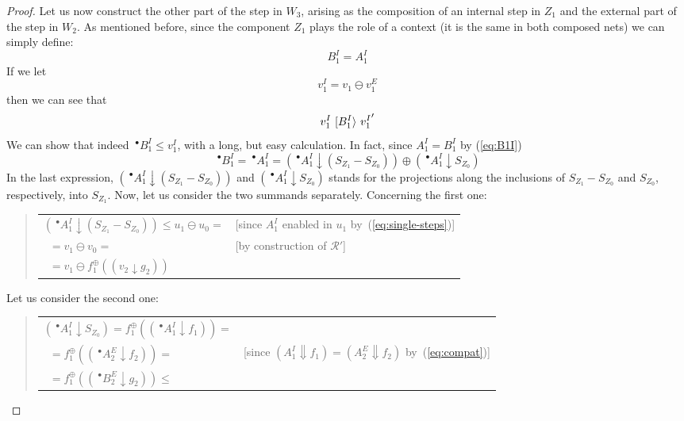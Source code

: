 \documentclass{LMCS}
\newcommand{\monSub}[2]{\ensuremath{{#1}_{#2}^\oplus}}
\newcommand{\res}[2]{\ensuremath{({#1}\!\downarrow\!{#2})}}
\newcommand{\sres}[2]{\ensuremath{({#1}\!\Downarrow\!{#2})}}
\newcommand{\pre}[1][(\cdot)]{\ensuremath{\!~^\bullet{#1}}}
\newcommand{\trans}[1]{\ensuremath{\ [\/{#1}\/\rangle}\ }
\begin{document}
\begin{proof}
  \bigskip

  Let us now construct the other part of the step in $W_3$,
  arising as the composition of an internal step in $Z_1$ and the
  external part of the step in $W_2$. As mentioned before, since the
  component $Z_1$ plays the role of a context (it is the same in both
  composed nets) we can simply define:
  \begin{equation}
    \label{eq:B1I}
    B_1^I=A_1^I
  \end{equation}
  If we let
  \begin{equation}
    \label{eq:v1I}
    v_1^I = v_1 \ominus v_1^E
  \end{equation}
  then we can see that
  \begin{equation}
    \label{eq:step-BI}
    v_1^I \trans{B_1^I} {v_1^I}'
  \end{equation}
  We can show that indeed $\pre[B_1^I] \leq v_1^I$, with a long, but
  easy calculation.  In fact, since $A_1^I = B_1^I$ by (\ref{eq:B1I})
  \begin{equation}
    \label{eq:B1Ileq}
    \pre[B_1^I] = \pre[A_1^I] = \res{\pre[A_1^I]}{(S_{Z_1} - S_{Z_0})} \oplus \res{\pre[A_1^I]}{S_{Z_0}}
  \end{equation}
  In the last expression, $\res{\pre[A_1^I]}{(S_{Z_1} - S_{Z_0})}$ and $
  \res{\pre[A_1^I]}{S_{Z_0}}$ stands for the projections along the
  inclusions of $S_{Z_1}-S_{Z_0}$ and $S_{Z_0}$, respectively, into $S_{Z_1}$. Now,
  let us consider the two summands separately. Concerning the first
  one:
  \begin{quote}
    \begin{tabular}{ll}
      $\res{\pre[A_1^I]}{(S_{Z_1}-S_{Z_0})}  \leq u_1 \ominus u_0 =$ &
      [since  $A_1^I$ enabled in $u_1$ by~(\ref{eq:single-steps})]\\
\ \quad $= v_1 \ominus v_0 =$ & 
      [by construction of $\mathcal{R}'$]\\
\ \quad $= v_1 \ominus \monSub{f}{1}(\res{v_2}{g_2})$
    \end{tabular}
  \end{quote}
  Let us consider the second one:
  \begin{quote}
    \begin{tabular}{ll}
      $\res{\pre[A_1^I]}{S_{Z_0}}  = \monSub{f}{1}(\res{\pre[A_1^I]}{f_1}) =$\\
\ \quad $= \monSub{f}{1}(\res{\pre[A_2^E]}{f_2}) =$ & 
      [since  $\sres{A_1^I}{f_1} = \sres{A_2^E}{f_2}$ by~(\ref{eq:compat})]\\
\ \quad $= \monSub{f}{1}(\res{\pre[B_2^E]}{g_2}) \leq$ &

\end{tabular}
\end{quote}
\end{proof}
\end{document}
